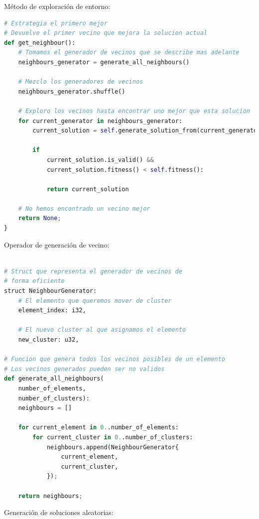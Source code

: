 \documentclass[11pt]{article}
\begin{document}
Método de exploración de entorno:

\begin{lstlisting}[language=Python, style=Boxed]
# Estrategia el primero mejor
# Devuelve el primer vecino que mejora la solucion actual
def get_neighbour():
    # Tomamos el generador de vecinos que se describe mas adelante
    neighbours_generator = generate_all_neighbours()

    # Mezclo los generadores de vecinos
    neighbours_generator.shuffle()

    # Exploro los vecinos hasta encontrar uno mejor que esta solucion
    for current_generator in neighbours_generator:
        current_solution = self.generate_solution_from(current_generator)

        if
            current_solution.is_valid() &&
            current_solution.fitness() < self.fitness():

            return current_solution

    # No hemos encontrado un vecino mejor
    return None;
}
\end{lstlisting}

Operador de generación de vecino:

\begin{lstlisting}[language=Python, style=Boxed]

# Struct que representa el generador de vecinos de
# forma eficiente
struct NeighbourGenerator:
    # El elemento que queremos mover de cluster
    element_index: i32,

    # El nuevo cluster al que asignamos el elemento
    new_cluster: u32,

# Funcion que genera todos los vecinos posibles de un elemento
# Los vecinos generados pueden ser no validos
def generate_all_neighbours(
    number_of_elements,
    number_of_clusters):
    neighbours = []

    for current_element in 0..number_of_elements:
        for current_cluster in 0..number_of_clusters:
            neighbours.append(NeighbourGenerator{
                current_element,
                current_cluster,
            });

    return neighbours;
\end{lstlisting}

Generación de soluciones aleatorias:
\end{document}

